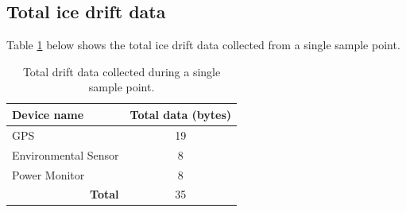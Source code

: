\begin{table}[H]
	\centering
	\caption{Description of output values from INA219 current sensor.}
	\setlength{\extrarowheight}{5pt}
	
	\label{tab:INA_Output}
\end{table}


\subsection{Total ice drift data}
Table \ref{tab:total_data} below shows the total ice drift data collected from a single sample point.

\begin{table}[H]
	\caption{Total drift data collected during a single sample point.}
	\setlength{\extrarowheight}{5pt}
	\tiny
	\centering
	\begin{tabular}{lc}
		\hline
		\textbf{Device name}  & \textbf{Total data (bytes)}\\
		\hline
		\hline
		GPS & 19 \\

		Environmental Sensor & 8 \\

		Power Monitor & 8\\
		\hline
		\hline
		\multicolumn{1}{r}{\textbf{Total}} & \multicolumn{1}{c}{35}\\
		\cline{2-2}
		\cline{2-2}
	\end{tabular}
	\label{tab:total_data}
\end{table}

